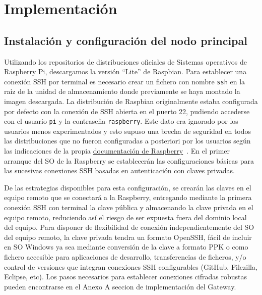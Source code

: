 \cleardoublepage

\chapter{Implementación}
\label{makereference5}



\section{Instalación y configuración del nodo principal}
\label{makereference5.1}
 Utilizando los repositorios de distribuciones oficiales de Sistemas operativos de Raspberry Pi, descargamos la versión ``Lite'' de Raspbian. Para establecer una conexión SSH por terminal es necesario crear un fichero con nombre \verb|ssh| en la raiz de la unidad de almacenamiento donde previamente se haya montado la imagen descargada. La distribución de Raspbian originalmente estaba configurada por defecto con la conexión de SSH abierta en el puerto 22, pudiendo accederse con el usuario \verb|pi| y la contraseña \verb|raspberry|. Este dato era ignorado por los usuarios menos experimentados y esto supuso una brecha de seguridad en todos las distribuciones que no fueron configuradas a posteriori por los usuarios según las indicaciones de la propia \href{https://www.raspberrypi.org/documentation/configuration/security.md}{documentación de Raspberry}~\cite{securingyourraspberrypi}. En el primer arranque del SO de la Raspberry se establecerán las configuraciones básicas para las sucesivas conexiones SSH basadas en autenticación con claves privadas.

 De las estrategias disponibles para esta configuración, se crearán las claves en el equipo remoto que se conectará a la Raspberry, entregando mediante la primera conexión SSH con terminal la clave pública y almacenando la clave privada en el equipo remoto, reduciendo así el riesgo de ser expuesta fuera del dominio local del equipo. Para disponer de flexibilidad de conexión independientemente del SO del equipo remoto, la clave privada tendra un formato OpenSSH, fácil de incluir en SO Windows ya sea mediante conversión de la clave a formato PPK o como fichero accesible para aplicaciones de desarrollo, transferencias de ficheros, y/o control de versiones que integran conexiones SSH configurables (GitHub, Filezilla, Eclipse, etc). Los pasos necesarios para establecer conexiones cifradas robustas pueden encontrarse en el Anexo A seccion de implementación del Gateway.

